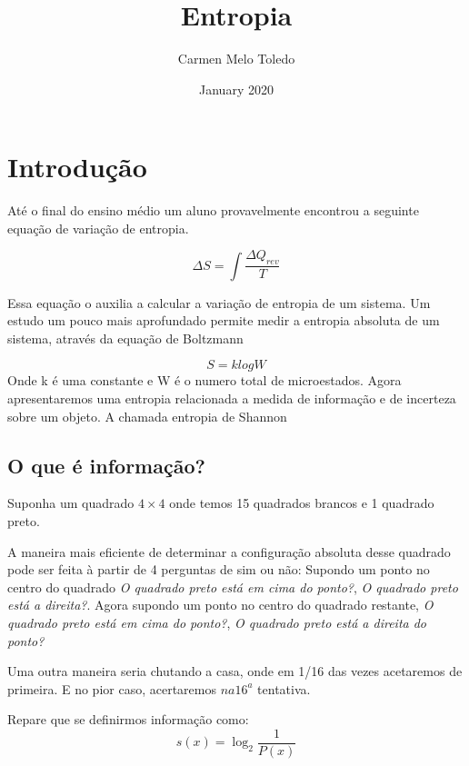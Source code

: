\documentclass{article}
\title{Entropia}
\author{Carmen Melo Toledo}
\date{January 2020}
\begin{document}
\maketitle

\section{Introdução}

Até o final do ensino médio um aluno provavelmente encontrou a seguinte equação de variação de entropia.

\begin{equation*}
    \Delta S = \int \frac{\Delta Q_{rev}}{T}
\end{equation*}

Essa equação o auxilia a calcular a variação de entropia de um sistema. Um estudo um pouco mais aprofundado permite medir a entropia absoluta de um sistema, através da equação de Boltzmann

\begin{equation*}
    S = k log W
\end{equation*}
Onde k é uma constante e W é o numero total de microestados. Agora apresentaremos uma entropia relacionada a medida de informação e de incerteza sobre um objeto. A chamada entropia de Shannon

\subsection{O que é informação?}

Suponha um quadrado $4 \times 4$ onde temos 15 quadrados brancos e 1 quadrado preto. 

A maneira mais eficiente de determinar a configuração absoluta desse quadrado pode ser feita à partir de 4 perguntas de sim ou não:
Supondo um ponto no centro do quadrado
\textit{O quadrado preto está em cima do ponto?}, \textit{O quadrado preto está a direita?}. Agora supondo um ponto no centro do quadrado restante, 
\textit{O quadrado preto está em cima do ponto?}, \textit{O quadrado preto está a direita do ponto?}

Uma outra maneira seria chutando a casa, onde em 1/16 das vezes acetaremos de primeira. E no pior caso, acertaremos $na 16^a$ tentativa.

Repare que se definirmos informação como:
\begin{equation}
    s(x) = \log_2\frac{1}{P(x)}
\end{equation}
\end{document}
